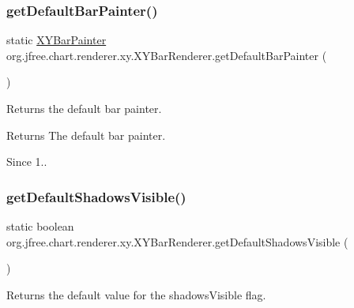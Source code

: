 \subsubsection{\texorpdfstring{get\+Default\+Bar\+Painter()}{getDefaultBarPainter()}}
{\footnotesize\ttfamily static \mbox{\hyperlink{interfaceorg_1_1jfree_1_1chart_1_1renderer_1_1xy_1_1_x_y_bar_painter}{X\+Y\+Bar\+Painter}} org.\+jfree.\+chart.\+renderer.\+xy.\+X\+Y\+Bar\+Renderer.\+get\+Default\+Bar\+Painter (\begin{DoxyParamCaption}{ }\end{DoxyParamCaption})\hspace{0.3cm}{\ttfamily [static]}}

Returns the default bar painter.

\begin{DoxyReturn}{Returns}
The default bar painter.
\end{DoxyReturn}
\begin{DoxySince}{Since}
1.. 
\end{DoxySince}
\mbox{\label{classorg_1_1jfree_1_1chart_1_1renderer_1_1xy_1_1_x_y_bar_renderer_adc7256cc011739e14552e7abf8f454d0}} 
\subsubsection{\texorpdfstring{get\+Default\+Shadows\+Visible()}{getDefaultShadowsVisible()}}
{\footnotesize\ttfamily static boolean org.\+jfree.\+chart.\+renderer.\+xy.\+X\+Y\+Bar\+Renderer.\+get\+Default\+Shadows\+Visible (\begin{DoxyParamCaption}{ }\end{DoxyParamCaption})\hspace{0.3cm}{\ttfamily [static]}}

Returns the default value for the {\ttfamily shadows\+Visible} flag.

